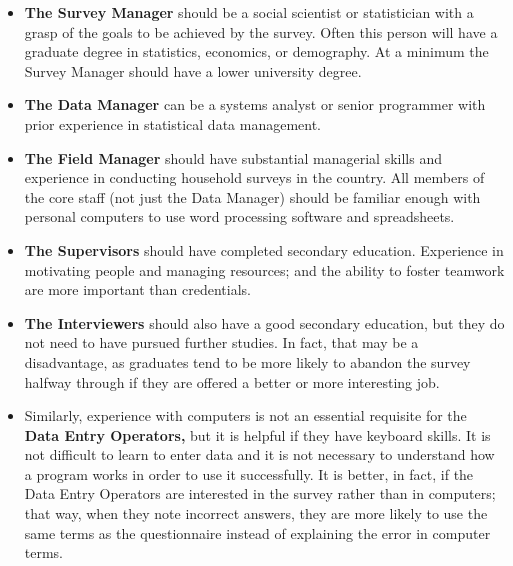 \documentclass[
]{article}
\begin{document}
\begin{itemize}
\item
  \textbf{The Survey Manager} should be a social scientist or statistician
  with a grasp of the goals to be achieved by the survey. Often this
  person will have a graduate degree in statistics, economics, or
  demography. At a minimum the Survey Manager should have a lower
  university degree.
\item
  \textbf{The Data Manager} can be a systems analyst or senior programmer
  with prior experience in statistical data management.
\item
  \textbf{The Field Manager} should have substantial managerial skills and
  experience in conducting household surveys in the country. All
  members of the core staff (not just the Data Manager) should be
  familiar enough with personal computers to use word processing
  software and spreadsheets.
\item
  \textbf{The Supervisors} should have completed secondary education.
  Experience in motivating people and managing resources; and the
  ability to foster teamwork are more important than credentials.
\item
  \textbf{The Interviewers} should also have a good secondary education,
  but they do not need to have pursued further studies. In fact, that
  may be a disadvantage, as graduates tend to be more likely to
  abandon the survey halfway through if they are offered a better or
  more interesting job.
\item
  Similarly, experience with computers is not an essential requisite
  for the \textbf{Data Entry Operators,} but it is helpful if they have
  keyboard skills. It is not difficult to learn to enter data and it
  is not necessary to understand how a program works in order to use
  it successfully. It is better, in fact, if the Data Entry Operators
  are interested in the survey rather than in computers; that way,
  when they note incorrect answers, they are more likely to use the
  same terms as the questionnaire instead of explaining the error in
  computer terms.
\end{itemize}
\end{document}
